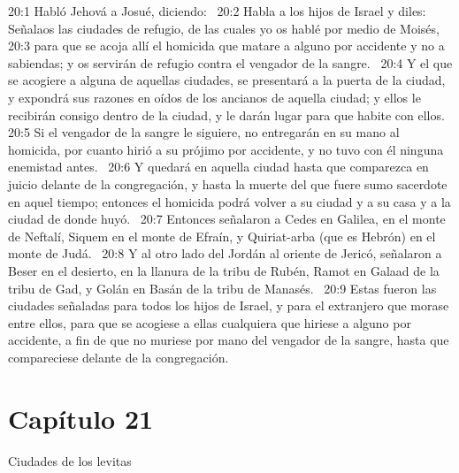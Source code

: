 20:1 Habló Jehová a Josué, diciendo:  
20:2 Habla a los hijos de Israel y diles: Señalaos las ciudades de refugio, de las cuales yo os hablé por medio de Moisés, 
20:3 para que se acoja allí el homicida que matare a alguno por accidente y no a sabiendas; y os servirán de refugio contra el vengador de la sangre.  
20:4 Y el que se acogiere a alguna de aquellas ciudades, se presentará a la puerta de la ciudad, y expondrá sus razones en oídos de los ancianos de aquella ciudad; y ellos le recibirán consigo dentro de la ciudad, y le darán lugar para que habite con ellos.  
20:5 Si el vengador de la sangre le siguiere, no entregarán en su mano al homicida, por cuanto hirió a su prójimo por accidente, y no tuvo con él ninguna enemistad antes.  
20:6 Y quedará en aquella ciudad hasta que comparezca en juicio delante de la congregación, y hasta la muerte del que fuere sumo sacerdote en aquel tiempo; entonces el homicida podrá volver a su ciudad y a su casa y a la ciudad de donde huyó.  
20:7 Entonces señalaron a Cedes en Galilea, en el monte de Neftalí, Siquem en el monte de Efraín, y Quiriat-arba (que es Hebrón) en el monte de Judá.  
20:8 Y al otro lado del Jordán al oriente de Jericó, señalaron a Beser en el desierto, en la llanura de la tribu de Rubén, Ramot en Galaad de la tribu de Gad, y Golán en Basán de la tribu de Manasés.  
20:9 Estas fueron las ciudades señaladas para todos los hijos de Israel, y para el extranjero que morase entre ellos, para que se acogiese a ellas cualquiera que hiriese a alguno por accidente, a fin de que no muriese por mano del vengador de la sangre, hasta que compareciese delante de la congregación.  
\section*{Capítulo 21}
Ciudades de los levitas   

